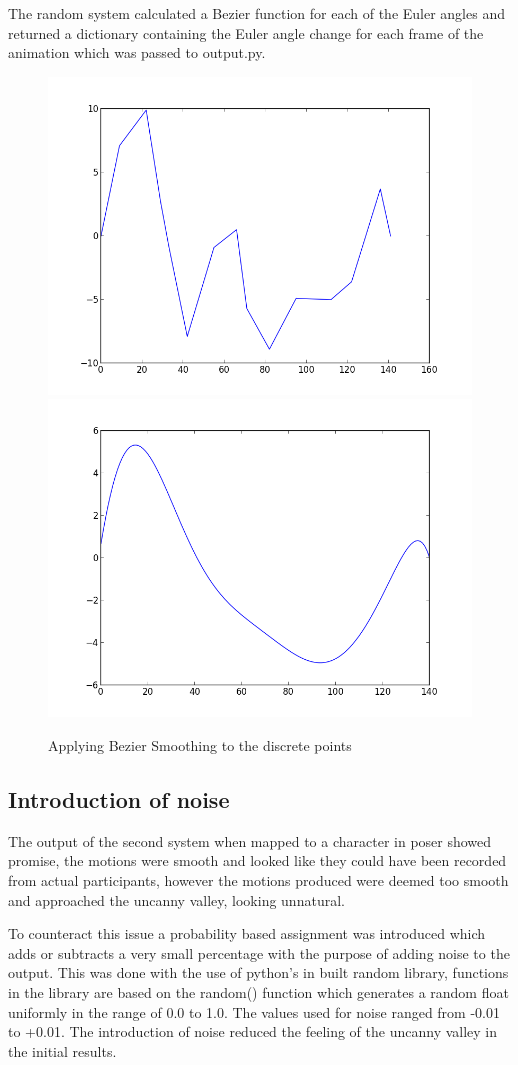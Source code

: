 \documentclass[bsc,frontabs,twoside,singlespacing,parskip]{infthesis}
\begin{document}
The random system calculated a Bezier function for each of the Euler angles and returned a dictionary containing the Euler angle change for each frame of the animation which was passed to output.py.


\begin{figure}
	\includegraphics[width=.5\textwidth]{figure_1.png}
	\includegraphics[width=.5\textwidth]{figure_2.png}
	\caption{Applying Bezier Smoothing to the discrete points}
\end{figure}

\subsection{Introduction of noise}

The output of the second system when mapped to a character in poser showed promise, the motions were smooth and looked like they could have been recorded from actual participants, however the motions produced were deemed too smooth and approached the uncanny valley, looking unnatural.

To counteract this issue a probability based assignment was introduced which adds or subtracts a very small percentage with the purpose of adding noise to the output. This was done with the use of python's in built random library, functions in the library are based on the random() function which generates a random float uniformly in the range of 0.0 to 1.0. The values used for noise ranged from -0.01 to +0.01. The introduction of noise reduced the feeling of the uncanny valley in the initial results.
\end{document}
